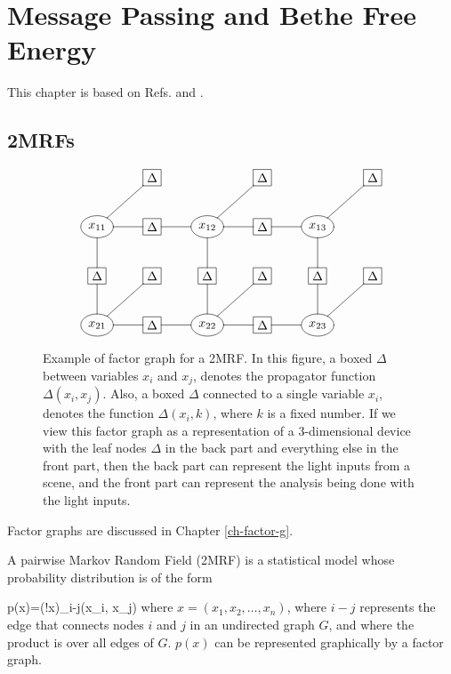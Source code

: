 \chapter{Message Passing and
Bethe Free Energy}
\label{ch-mpass-bethe}

\newcommand{\ttheta}[0]{\TIL{\theta}}
\newcommand{\tP}[0]{\TIL{p}}

This chapter is based
on Refs. \cite{WainJordan}
and \cite{yedidia}.

\section{2MRFs}



\begin{figure}[h!]
$$\xymatrix{
&*+[F]{\Delta}
&
&*+[F]{\Delta}
&
&*+[F]{\Delta}
\\
*++[o][F]{x_{11}}
\ar@{-}[d]\ar@{-}[r]\ar@{-}[ru]
&*+[F]{\Delta}\ar@{-}[r]
&*++[o][F]{x_{12}}\ar@{-}[d]\ar@{-}[r]
\ar@{-}[ru]
&*+[F]{\Delta}\ar@{-}[r]
&*++[o][F]{x_{13}}\ar@{-}[d]
\ar@{-}[ru]
\\
*+[F]{\Delta}\ar@{-}[d]
&*+[F]{\Delta}
&*+[F]{\Delta}\ar@{-}[d]
&*+[F]{\Delta}
&*+[F]{\Delta}\ar@{-}[d]
&*+[F]{\Delta}
\\
*++[o][F]{x_{21}}\ar@{-}[r]\ar@{-}[ru]
&*+[F]{\Delta}\ar@{-}[r]
&*++[o][F]{x_{22}}\ar@{-}[r]\ar@{-}[ru]
&*+[F]{\Delta}\ar@{-}[r]
&*++[o][F]{x_{23}}\ar@{-}[ru]
}$$
\caption{Example
of factor graph
for a 2MRF.
In this figure,
a boxed $\Delta$
between variables $x_i$
and $x_j$,
denotes the propagator  function
$\Delta(x_i, x_j)$.
Also, a boxed
$\Delta$
connected to a
single variable $x_i$,
denotes the function
$\Delta(x_i, k)$,
where $k$
is a fixed number.
If we view this factor graph
as a representation of a 3-dimensional device
with the leaf nodes $\Delta$
in the back part and everything else in the front part,
then the back part can represent the light inputs from a scene, and the front part
can represent the analysis being done
with the light inputs.
}
\label{fig-paiwise-mrf}
\end{figure}

Factor graphs
are discussed in Chapter \ref{ch-factor-g}.

A pairwise Markov Random Field (2MRF)
is a statistical model
whose probability
distribution
is of the form

\beq
p(x)=\caln(!x)\prod_{i-j}\Delta(x_i, x_j)
\label{eq-2mrf}
\eeq
where $x=(x_1, x_2,
\ldots, x_n )$,
where $i-j$
represents the edge
that connects
nodes $i$ and $j$
in an undirected graph $G$,
and where  the product
is over all edges of $G$.
$p(x)$ can be represented
graphically
by a factor graph.

